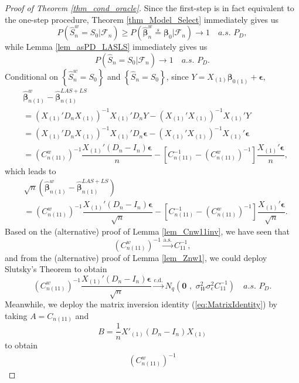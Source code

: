 \documentclass[ejs,authoryear,linksfromyear]{imsart}
\newcommand{\CONV}[1]{\stackrel{\text{#1}}{\longrightarrow}} %
\newcommand{\bnw}{\widehat{\bm{\beta}}_n^w} %
\newcommand{\bnwa}{\widehat{\bm{\beta}}_{n(1)}^w}
\newcommand{\cnwa}{C_{n(11)}^w}
\numberwithin{equation}{section}
\theoremstyle{plain}
\begin{document}
\begin{proof}[Proof of Theorem \ref{thm_cond_oracle}]
	Since the first-step is in fact equivalent to the one-step procedure, Theorem \ref{thm_Model_Select} immediately gives us 
	$$
	P \left(
		\widehat{S}_n^w = S_0	
	\big| \mathcal{F}_n
	\right) 
	\geq 
	P\left(
		\bnw \stackrel{s}{=} \bm{\beta}_0
	\big| \mathcal{F}_n 
	\right)	
	\to 1
	\quad a.s. \,\, P_D,
	$$ 
	while Lemma \ref{lem_asPD_LASLS} immediately gives us 
	$$
	P \left(
	\widehat{S}_n = S_0	
	\big| \mathcal{F}_n
	\right) 
	\to 1
	\quad a.s. \,\, P_D.
	$$
	Conditional on $\left\{ \widehat{S}_n^w = S_0 \right\}$ and $\left\{ \widehat{S}_n = S_0 \right\}$, since $Y = X_{(1)} \bm{\beta}_{0(1)} + \bm{\epsilon}$,
	\begin{align*}
	&\bnwa - \widehat{\bm{\beta}}_{n(1)}^{LAS+LS} \\
	&= \left(
		X_{(1)}' D_n X_{(1)} 
	\right)^{-1} X_{(1)}' D_n Y
	- \left(
	X_{(1)}' X_{(1)} 
	\right)^{-1} X_{(1)}' Y \\
	&=  \left(
		X_{(1)}' D_n X_{(1)} 
	\right)^{-1} X_{(1)}' D_n \bm{\epsilon}
	- \left(
		X_{(1)}' X_{(1)} 
	\right)^{-1} X_{(1)}' \bm{\epsilon} \\
	&= \left(
		\cnwa
	\right)^{-1}  
	\dfrac{X_{(1)}' (D_n - I_n) \bm{\epsilon}}{n}
	- \left[
		C_{n(11)}^{-1} - \left( \cnwa \right)^{-1}  
	\right] 
	\dfrac{X_{(1)}' \bm{\epsilon}}{n},
	\end{align*}  
	which leads to 
	\begin{align*}
	&\sqrt{n}
	\left(
		\bnwa - \widehat{\bm{\beta}}_{n(1)}^{LAS+LS}
	\right) \\
	&= \left(
	\cnwa
	\right)^{-1}  
	\dfrac{X_{(1)}' (D_n - I_n) \bm{\epsilon}}{\sqrt{n}}
	- \left[
	C_{n(11)}^{-1} - \left( \cnwa \right)^{-1}  
	\right] 
	\dfrac{X_{(1)}' \bm{\epsilon}}{\sqrt{n}}.
	\end{align*}
	Based on the (alternative) proof of Lemma \ref{lem_Cnw11inv}, we have seen that
	$$
	\left( \cnwa \right)^{-1}
	\CONV{a.s.} C_{11}^{-1},
	$$	
	and from the (alternative) proof of Lemma \ref{lem_Znw1}, we could deploy Slutsky's Theorem to obtain
	$$
	\left(
	\cnwa
	\right)^{-1}  
	\dfrac{X_{(1)}' (D_n - I_n) \bm{\epsilon}}{\sqrt{n}}
	\CONV{c.d.}
	N_q \left(
		\bm{0} \,\, , \,\, 
		\sigma^2_W \sigma^2_\epsilon C_{11}^{-1}
	\right)
	\quad a.s. \,\, P_D.
	$$ 
	Meanwhile, we deploy the matrix inversion identity (\ref{eq:MatrixIdentity}) by taking $A = C_{n(11)}$ and
	$$
	B = \dfrac{1}{n} X'_{(1)} (D_n - I_n) X_{(1)}
	$$
	to obtain
	\begin{align*}
	\left( \cnwa \right)^{-1} 

\end{align*}
\end{proof}
\end{document}
